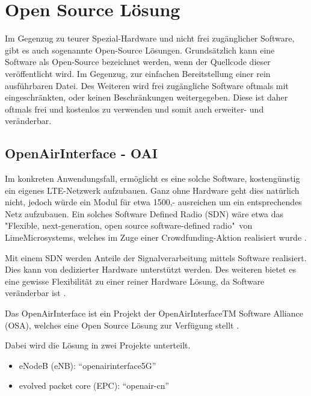 
%
%
% 
% 
% 

\section{Open Source Lösung}
\label{sec:open_source}

Im Gegenzug zu teurer Spezial-Hardware und nicht frei zugänglicher Software, gibt es auch sogenannte Open-Source Lösungen. Grundsätzlich kann eine Software als Open-Source bezeichnet werden, wenn der Quellcode dieser veröffentlicht wird. Im Gegenzug, zur einfachen Bereitstellung einer rein ausführbaren Datei.
Des Weiteren wird frei zugängliche Software oftmals mit eingeschränkten, oder keinen Beschränkungen weitergegeben. Diese ist daher oftmals frei und kostenlos zu verwenden und somit auch erweiter- und veränderbar. \cite{gacek2004many}

\subsection{OpenAirInterface - OAI}
Im konkreten Anwendungsfall, ermöglicht es eine solche Software, kostengünstig ein eigenes LTE-Netzwerk aufzubauen. 
Ganz ohne Hardware geht dies natürlich nicht, jedoch würde ein Modul für etwa 1500,- ausreichen um ein entsprechendes Netz aufzubauen. Ein solches Software Defined Radio (SDN) wäre etwa das "Flexible, next-generation, open source software-defined radio"\ von LimeMicrosystems, welches im Zuge einer Crowdfunding-Aktion realisiert wurde \cite{CroudLime01}. 

Mit einem SDN werden Anteile der Signalverarbeitung mittels Software realisiert. Dies kann von dedizierter Hardware unterstützt werden. Des weiteren bietet es eine gewisse Flexibilität zu einer reiner Hardware Lösung, da Software veränderbar ist \cite{jondral2005software}. 

Das OpenAirInterface ist ein Projekt der OpenAirInterfaceTM Software Alliance (OSA), welches eine Open Source Lösung zur Verfügung stellt \cite{OpenAir19}.

Dabei wird die Lösung in zwei Projekte unterteilt. 
\begin{itemize}
	\item eNodeB (eNB): “openairinterface5G”
	\item evolved packet core (EPC): “openair-cn”
\end{itemize}

